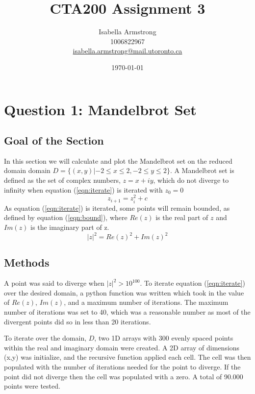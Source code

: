 \documentclass[12pt]{article}
\title{CTA200 Assignment 3}
\author{Isabella Armstrong \\ 1006822967\\
\href{mailto:isabella.armstrong@mail.utoronto.ca}{isabella.armstrong@mail.utoronto.ca}}
\date{\today}
\begin{document}
\maketitle


\section{Question 1: Mandelbrot Set}
\subsection{Goal of the Section}


In this section we will calculate and plot the Mandelbrot set on the reduced domain domain $D = \{ (x,y)| -2 \leq x\leq 2, -2\leq y\leq2\}$. A Mandelbrot set is defined as the set of complex numbers, $z = x + iy$, which do not diverge to infinity when equation (\ref{eqn:iterate}) is iterated with $z_0 =0 $ \cite{wiki} 
\begin{equation}\label{eqn:iterate}
    z_{i+1} = z^2_i + c
\end{equation}
As equation (\ref{eqn:iterate}) is iterated, some points will remain bounded, as defined by equation (\ref{eqn:bound}), where $Re(z)$ is the real part of $z$ and $Im(z)$ is the imaginary part of z. 
\begin{equation}\label{eqn:bound}
    |z|^2 = Re(z)^2 + Im(z)^2
\end{equation}


\subsection{Methods}

A point was said to diverge when $|z|^2 > 10^{100}$.
To iterate equation (\ref{eqn:iterate}) over the desired domain, a python function was written which took in the value of $Re(z)$,  $Im(z)$, and a maximum number of iterations. The maximum number of iterations was set to 40, which was a reasonable number as most of the divergent points did so in less than 20 iterations. \par 
To iterate over the domain, $D$, two 1D arrays with 300 evenly spaced points within the real and imaginary domain were created. A 2D array of dimensions (x,y) was initialize, and the recursive function applied each cell. The cell was then populated with the number of iterations needed for the point to diverge. If the point did not diverge then the cell was populated with a zero. A total of 90.000 points were tested. \par 
\end{document}
